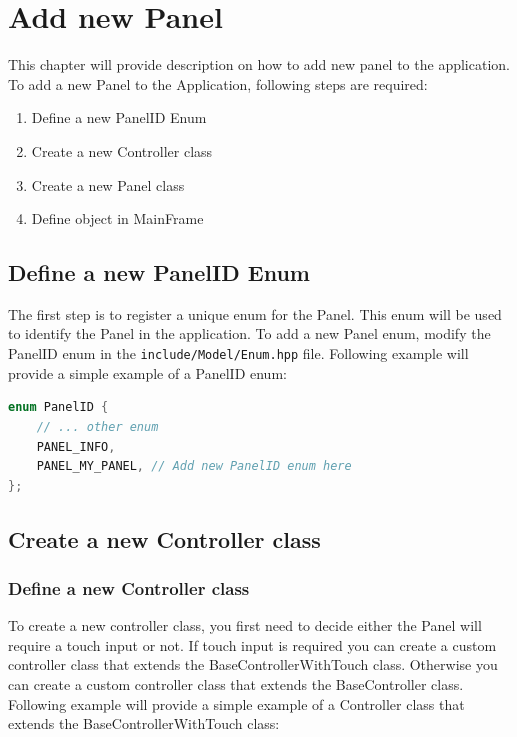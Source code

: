 \chapter{Add new Panel}

This chapter will provide description on how to add new panel to the application. To add a new Panel to the Application, following steps are required:
\begin{enumerate}
      \item Define a new PanelID Enum
      \item Create a new Controller class
      \item Create a new Panel class
      \item Define object in MainFrame
\end{enumerate}

\section{Define a new PanelID Enum}

The first step is to register a unique enum for the Panel. This enum will be used to identify the Panel in the application. To add a new Panel enum, modify the PanelID enum in the \texttt{include/Model/Enum.hpp} file. Following example will provide a simple example of a PanelID enum:

\begin{lstlisting}[language=C++, caption={PanelID enum example}]
enum PanelID {
    // ... other enum
    PANEL_INFO,
    PANEL_MY_PANEL, // Add new PanelID enum here
};
\end{lstlisting}

\section{Create a new Controller class}

\subsection{Define a new Controller class}

To create a new controller class, you first need to decide either the Panel will require a touch input or not. If touch input is required you can create a custom controller class that extends the BaseControllerWithTouch class. Otherwise you can create a custom controller class that extends the BaseController class. Following example will provide a simple example of a Controller class that extends the BaseControllerWithTouch class:

